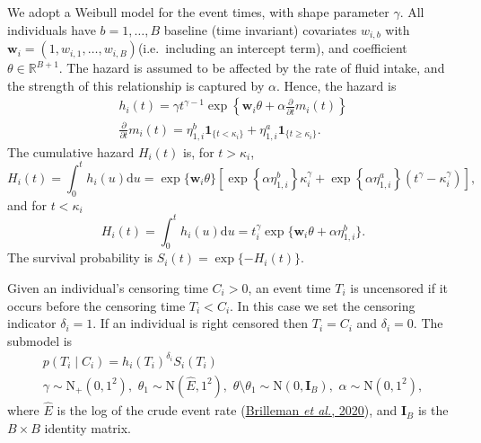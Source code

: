 \documentclass[
  10pt,
  a4paper,
]{article}
\begin{document}
We adopt a Weibull model for the event times, with shape parameter
\(\gamma\). All individuals have \(b = 1, \ldots, B\) baseline (time
invariant) covariates \(w_{i, b}\) with
\(\boldsymbol{w}_{i} = (1, w_{i, 1}, \ldots, w_{i, B})\)(i.e.~including
an intercept term), and coefficient \(\theta \in \mathbb{R}^{B + 1}\).
The hazard is assumed to be affected by the rate of fluid intake, and
the strength of this relationship is captured by \(\alpha\). Hence, the
hazard is \begin{gather}
  h_{i}(t) = \gamma t^{\gamma - 1} \exp\left\{\boldsymbol{w}_{i}\theta + \alpha \frac{\partial}{\partial t} m_{i}(t)\right\} \\
  \frac{\partial}{\partial t} m_{i}(t) = \eta^{b}_{1, i}\boldsymbol{1}_{\{t < \kappa_{i}\}} + \eta^{a}_{1, i}\boldsymbol{1}_{\{t \geq \kappa_{i}\}}.
\end{gather} The cumulative hazard \(H_{i}(t)\) is, for
\(t > \kappa_{i}\), \begin{equation}
  H_{i}(t)
  = \int_{0}^{t} h_{i}(u) \text{d}u
  = \exp\{\boldsymbol{w}_{i}\theta\}
    \left[
      \exp\left\{
        \alpha \eta^{b}_{1, i}
      \right\}
      \kappa_{i}^{\gamma}
      +
      \exp\left\{
        \alpha \eta^{a}_{1, i}
      \right\}
      (t^{\gamma} - \kappa_{i}^{\gamma})
    \right],
\end{equation} and for \(t < \kappa_{i}\) \begin{equation}
  H_{i}(t)
  = \int_{0}^{t} h_{i}(u) \text{d}u
  = t_{i}^{\gamma} \exp\{\boldsymbol{w}_{i}\theta + \alpha \eta^{b}_{1, i}\}.
\end{equation} The survival probability is
\(S_{i}(t) = \exp\{-H_{i}(t)\}\).

Given an individual's censoring time \(C_{i} > 0\), an event time
\(T_{i}\) is uncensored if it occurs before the censoring time
\(T_{i} < C_{i}\). In this case we set the censoring indicator
\(\delta_{i} = 1\). If an individual is right censored then
\(T_{i} = C_{i}\) and \(\delta_{i} = 0\). The submodel is
\begin{equation}
\begin{gathered}
  p(T_{i} \mid C_{i}) = h_{i}(T_{i})^{\delta_{i}} S_{i}(T_{i}) \\
  \gamma \sim \text{N}_{+}(0, 1^2), \, \,
  \theta_{1} \sim \text{N}(\hat{E}, 1^2), \, \,
  \theta \setminus \theta_{1} \sim \text{N}(0, \boldsymbol{I}_{B}), \, \,
  \alpha \sim \text{N}(0, 1^2),
  \label{eqn:surv-submodel-def}
\end{gathered}
\end{equation} where \(\hat{E}\) is the log of the crude event rate
(\protect\hyperlink{ref-brilleman_bayesian_2020}{Brilleman \emph{et
al.}, 2020}), and \(\boldsymbol{I}_{B}\) is the \(B \times B\) identity
matrix.
\end{document}
